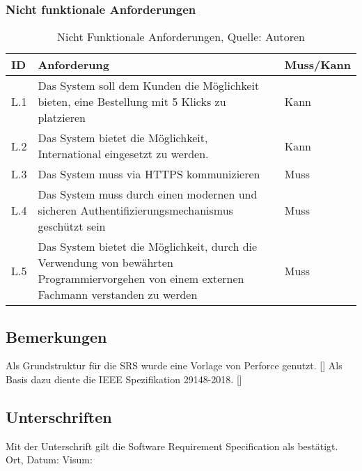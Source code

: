 \subsubsection{Nicht funktionale Anforderungen}
\begin{table}[H]
	\setlength\extrarowheight{2pt} %
	\begin{tabularx}{\textwidth}{|l|X|l|}
		\hline
		\textbf{ID} &  \textbf{Anforderung} & \textbf{Muss/Kann}  \\
        \hline
		L.1 & Das System soll dem Kunden die Möglichkeit bieten, eine Bestellung mit 5 Klicks zu platzieren  & Kann \\
		\hline
		L.2 & Das System bietet die Möglichkeit, International eingesetzt zu werden. & Kann \\
		\hline
		L.3 & Das System muss via HTTPS kommunizieren & Muss \\
		\hline
		L.4 & Das System muss durch einen modernen und sicheren Authentifizierungsmechanismus geschützt sein & Muss \\
		\hline
		L.5 & Das System bietet die Möglichkeit, durch die Verwendung von bewährten Programmiervorgehen von einem externen Fachmann verstanden zu werden & Muss \\
		\hline
	\end{tabularx}
	\caption{ \label{tbl: NichtFunktionaleAnforderungent}Nicht Funktionale Anforderungen, Quelle: Autoren}
\end{table}
\newpage
\subsection{Bemerkungen}
Als Grundstruktur für die SRS wurde eine Vorlage von Perforce genutzt. [\cite{srsdocument}]
Als Basis dazu diente die IEEE Spezifikation 29148-2018. [\cite{ieeeSrs}]

\subsection{Unterschriften}
Mit der Unterschrift gilt die Software Requirement Specification als bestätigt.\\

Ort, Datum:	\underline{\hspace*{6cm}}	\hspace*{1cm} Visum:	\underline{\hspace*{4cm}}


\newpage
